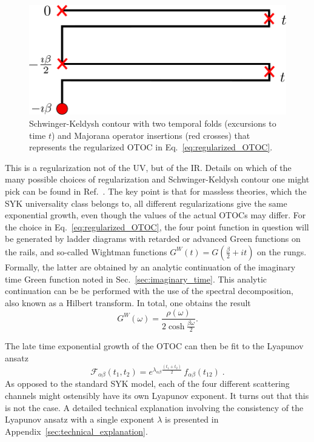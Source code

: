 \begin{figure}
	\centering
	\includegraphics[width=1.0\columnwidth]{figures/chapter1/TwoFoldCountour.png}
	
	\caption{Schwinger-Keldysh contour with two temporal folds (excursions to time $t$) and Majorana operator insertions (red crosses) that represents the regularized OTOC in Eq.~\eqref{eq:regularized_OTOC}.}
	\label{fig:two_fold_contour}
\end{figure}
%
This is a regularization not of the UV, but of the IR. Details on which of the many possible choices of regularization and Schwinger-Keldysh contour one might pick can be found in Ref.~\cite{romero2019regularization}.
The key point is that for massless theories, which the SYK universality class belongs to,
all different regularizations give the same exponential growth, even though the values of the actual OTOCs may differ.
For the choice in Eq.~\eqref{eq:regularized_OTOC}, the four point function in question will be generated by ladder diagrams with retarded or advanced Green functions on the rails,
and so-called Wightman functions $G^W(t)=G(\frac{\beta}{2} + i t)$ on the rungs.
Formally, the latter are obtained by an analytic continuation of the imaginary time Green function noted in Sec.~\ref{sec:imaginary_time}.
This analytic continuation can be be performed with the use of the spectral decomposition, also known as a Hilbert transform.
In total, one obtains the result
\begin{equation}
	G^W(\omega) = \frac{\rho(\omega)}{2\cosh{\frac{\beta\omega}{2}}}.
\end{equation}



The late time exponential growth of the OTOC \cite{maldacena_bound_2016} can then be fit to the Lyapunov ansatz
%
\begin{equation}
	\mathcal{F}_{\alpha\beta}(t_1,t_2) = e^{\lambda_{\alpha\beta}\frac{(t_1 + t_2)}{2}}\, f_{\alpha\beta}(t_{12})\;.
	\label{eq:Lyapunov_Ansatz}
\end{equation}
%
As opposed to the standard SYK model, each of the four different scattering channels might ostensibly have its own Lyapunov exponent. It turns out that this is not the case.
A detailed technical explanation involving the consistency of the Lyapunov ansatz with a single exponent $\lambda$ is presented in Appendix~\ref{sec:technical_explanation}. 

